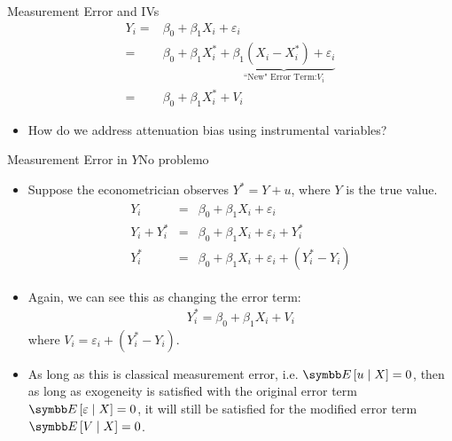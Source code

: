 \documentclass[aspectratio=169,11pt]{beamer}
\begin{document}
\begin{frame}{Measurement Error and IVs}
		\begin{align*}
			Y_i =& \beta_0 + \beta_1 X_i + \varepsilon_i\\
				=& \beta_0 + \beta_1 X_i^* + \underbrace{\beta_1(X_i - X_i^*) + \varepsilon_i}_{\text{``New" Error Term:} V_i}\\
				=& \beta_0 + \beta_1 X_i^* + V_i
		\end{align*}
\begin{itemize}
	\item How do we address attenuation bias using instrumental variables? 
\end{itemize}
\end{frame}



\begin{frame}{Measurement Error in $Y$}{No problemo}	
	\begin{itemize}
		\item Suppose the econometrician observes $Y^{*} = Y + u$, where $Y$ is the true value.
\begin{align*}
\begin{array}{ccl}
Y_{i} & = & \beta_{0}+\beta_{1}X_{i}+\varepsilon_{i}\\
Y_{i}+Y_{i}^{*} & = & \beta_{0}+\beta_{1}X_{i}+\varepsilon_{i}+Y_{i}^{*}\\
Y_{i}^{*} & = & \beta_{0}+\beta_{1}X_{i}+\varepsilon_{i}+\left(Y_{i}^{*}-Y_{i}\right)
\end{array}
\end{align*}
	\item Again, we can see this as changing the error term:
\begin{align*}
Y_{i}^{*}=\beta_{0}+\beta_{1}X_{i}+V_{i}
\end{align*}
where $V_{i}=\varepsilon_{i}+\left(Y_{i}^{*}-Y_{i}\right).$	
		
		\item As long as this is classical measurement error, i.e. $\E\left[u \mid X\right]= 0$,
		then as long as exogeneity is satisfied with the original error term $\E\left[\varepsilon \mid X\right]=0$,
		it will still be satisfied for the modified error term $\E\left[V \mid X\right]=0$.
		
\end{itemize}
\end{frame}		
\end{document}
